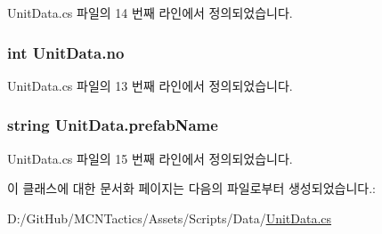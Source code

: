 Unit\+Data.\+cs 파일의 14 번째 라인에서 정의되었습니다.

\subsubsection[{\texorpdfstring{no}{no}}]{\setlength{\rightskip}{0pt plus 5cm}int Unit\+Data.\+no}\hypertarget{class_unit_data_a45de9d7b5ceb45a81feca29b67e1c46c}{}\label{class_unit_data_a45de9d7b5ceb45a81feca29b67e1c46c}


Unit\+Data.\+cs 파일의 13 번째 라인에서 정의되었습니다.

\subsubsection[{\texorpdfstring{prefab\+Name}{prefabName}}]{\setlength{\rightskip}{0pt plus 5cm}string Unit\+Data.\+prefab\+Name}\hypertarget{class_unit_data_a1523fa01f295711683596fec6f3268e5}{}\label{class_unit_data_a1523fa01f295711683596fec6f3268e5}


Unit\+Data.\+cs 파일의 15 번째 라인에서 정의되었습니다.



이 클래스에 대한 문서화 페이지는 다음의 파일로부터 생성되었습니다.\+:\begin{DoxyCompactItemize}
\item 
D\+:/\+Git\+Hub/\+M\+C\+N\+Tactics/\+Assets/\+Scripts/\+Data/\hyperlink{_unit_data_8cs}{Unit\+Data.\+cs}\end{DoxyCompactItemize}
